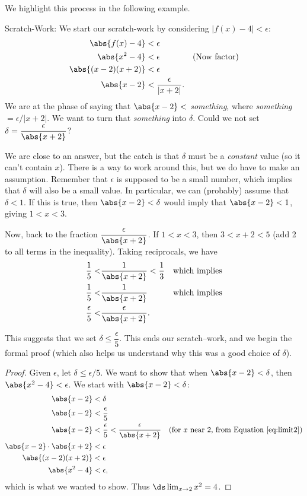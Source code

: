 We highlight this process in the following example.\\

{Scratch-Work:
We start our scratch-work by considering $|f(x)-4| < \epsilon$:
\begin{align}
\abs{f(x)-4} &< \epsilon \notag\\
\abs{x^2-4} &< \epsilon & \text{(Now factor)}\notag\\
\abs{(x-2)(x+2)} &< \epsilon \notag\\
\abs{x-2} &<\frac{\epsilon}{|x+2|}.\label{eq:lim1}
\end{align}
We are at the phase of saying that $\abs{x-2}<$ \textit{something}, where \textit{something}$=\epsilon/|x+2|$. We want to turn that \textit{something} into $\delta$. Could we not set $\delta = \dfrac{\epsilon}{\abs{x+2}}$?  

We are close to an answer, but the catch is that $\delta$ must be a \textit{constant} value (so it can't contain $x$).  There is a way to work around this, but we do have to make an assumption.  Remember that $\epsilon$ is supposed to be a small number, which implies that $\delta$ will also be a small value.  In particular, we can (probably) assume that $\delta < 1$.  If this is true, then $\abs{x-2}< \delta$ would imply that $\abs{x-2}< 1$, giving $1 < x < 3$.  

Now, back to the fraction $\dfrac{\epsilon}{\abs{x+2}}$.  If $1<x<3$, then $3<x+2<5$ (add 2 to all terms in the inequality).  Taking reciprocals, we have 
\begin{align}
\frac15 <& \frac1{\abs{x+2}} < \frac 13 & \text{which implies}\notag\\
\frac15 <& \frac1{\abs{x+2}} & \text{which implies}\notag\\
\frac\epsilon5<&\frac{\epsilon}{\abs{x+2}}\text{.}\label{eq:limit2}
\end{align}

This suggests that we set 
$\delta \leq \dfrac{\epsilon}{5}$. This ends our scratch--work, and we begin the formal proof (which also helps us understand why this was a good choice of $\delta$).

\drawexampleline
\begin{proof}
Given $\epsilon$, let $\delta \leq \epsilon/5$. We want to show that when $\abs{x-2}<\delta$, then $\abs{x^2-4}<\epsilon$. We start with $\abs{x-2}<\delta$:
\begin{align*}
\abs{x-2} &< \delta \\
\abs{x-2} &< \frac{\epsilon}5\\
\abs{x-2} &< \frac\epsilon5 < \frac{\epsilon}{\abs{x+2}} & \text{(for $x$ near 2, from Equation \eqref{eq:limit2})}\\
\abs{x-2}\cdot\abs{x+2} &< \epsilon\\
\abs{(x-2)(x+2)} &< \epsilon\\
\abs{x^2-4} &<\epsilon,
\end{align*}
which is what we wanted to show. Thus $\ds \lim_{x\to 2}x^2 = 4$.
\end{proof}

}
